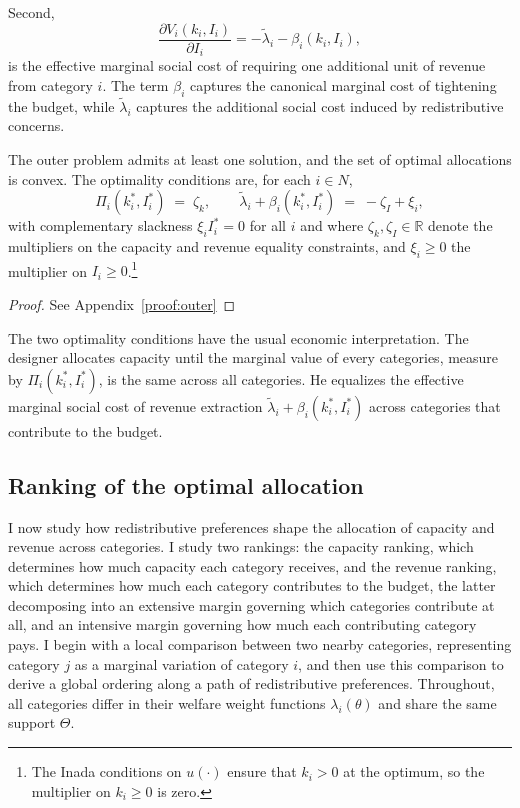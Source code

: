 \documentclass{class}
\begin{document}
Second,
\[
\frac{\partial  V_i(k_i,I_i)}{\partial I_i}
=
-\tilde\lambda_i-\beta_i(k_i,I_i),
\]
is the effective marginal social cost of requiring one additional unit of revenue from category \(i\). The term \(\beta_i\) captures the canonical marginal cost of tightening the budget, while \(\tilde\lambda_i\) captures the additional social cost induced by redistributive concerns.

\begin{lemma}\label{lem:outer}
The outer problem admits at least one solution, and the set of optimal allocations is convex. The optimality conditions are, for each $i \in N$,
\[
\Pi_i(k_i^\ast,I_i^\ast) \;=\; \zeta_k, \qquad \tilde\lambda_i + \beta_i(k_i^\ast,I_i^\ast) \;=\; -\zeta_I + \xi_i,
\]
with complementary slackness $\xi_i I_i^\ast = 0$ for all $i$ and where $\zeta_k, \zeta_I \in \mathbb{R}$ denote the multipliers on the capacity and revenue equality constraints, and $\xi_i \ge 0$ the multiplier on $I_i \ge 0$.\footnote{The Inada conditions on $u(\cdot)$ ensure that $k_i>0$ at the optimum, so the multiplier on $k_i \ge 0$ is zero.}
\end{lemma}
\begin{proof}
    See Appendix~\ref{proof:outer}
\end{proof}

The two optimality conditions have the usual economic interpretation. The designer allocates capacity until the marginal value of every categories, measure by $\Pi_i(k_i^\ast,I_i^\ast)$, is the same across all categories. He equalizes the effective marginal social cost of revenue extraction $\tilde\lambda_i + \beta_i(k_i^\ast,I_i^\ast)$ across categories that contribute to the budget.



\subsection{Ranking of the optimal allocation}\label{sec:rankingall}

I now study how redistributive preferences shape the allocation of capacity and revenue across categories. I study two rankings: the capacity ranking, which determines how much capacity each category receives, and the revenue ranking, which determines how much each category contributes to the budget, the latter decomposing into an extensive margin governing which categories contribute at all, and an intensive margin governing how much each contributing category pays. I begin with a local comparison between two nearby categories, representing category \(j\) as a marginal variation of category \(i\), and then use this comparison to derive a global ordering along a path of redistributive preferences. Throughout, all categories differ in their welfare weight functions \(\lambda_i(\theta)\) and share the same support \(\Theta\).
\end{document}
